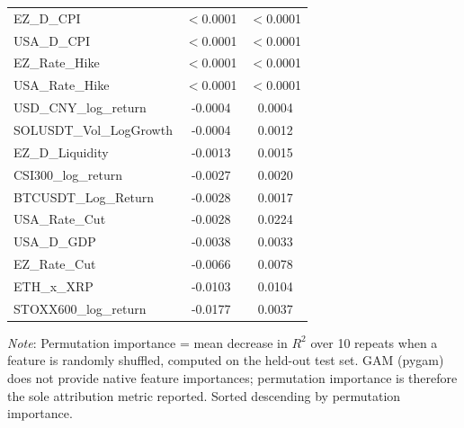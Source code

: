 \begin{tabular}{lcc}
  EZ\_D\_CPI & $<$0.0001 & $<$0.0001 \\ 
  USA\_D\_CPI & $<$0.0001 & $<$0.0001 \\ 
  EZ\_Rate\_Hike & $<$0.0001 & $<$0.0001 \\ 
  USA\_Rate\_Hike & $<$0.0001 & $<$0.0001 \\ 
  USD\_CNY\_log\_return & -0.0004 & 0.0004 \\ 
  SOLUSDT\_Vol\_LogGrowth & -0.0004 & 0.0012 \\ 
  EZ\_D\_Liquidity & -0.0013 & 0.0015 \\ 
  CSI300\_log\_return & -0.0027 & 0.0020 \\ 
  BTCUSDT\_Log\_Return & -0.0028 & 0.0017 \\ 
  USA\_Rate\_Cut & -0.0028 & 0.0224 \\ 
  USA\_D\_GDP & -0.0038 & 0.0033 \\ 
  EZ\_Rate\_Cut & -0.0066 & 0.0078 \\ 
  ETH\_x\_XRP & -0.0103 & 0.0104 \\ 
  STOXX600\_log\_return & -0.0177 & 0.0037 \\ 
  \bottomrule
\end{tabular}
\par\vspace{4pt}
\begin{minipage}{\linewidth}
  \footnotesize \textit{Note}: Permutation importance = mean decrease in $R^2$ over 10 repeats when a feature is randomly shuffled, computed on the held-out test set. GAM (pygam) does not provide native feature importances; permutation importance is therefore the sole attribution metric reported. Sorted descending by permutation importance.
\end{minipage}